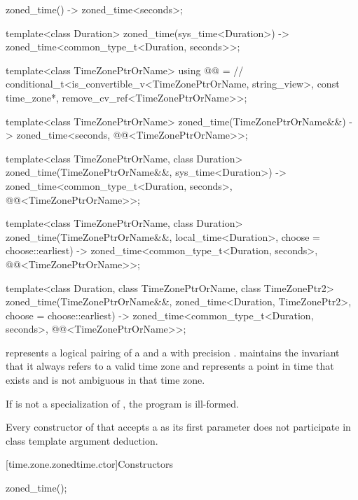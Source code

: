 \begin{codeblock}
{  zoned_time() -> zoned_time<seconds>;

  template<class Duration>
    zoned_time(sys_time<Duration>)
      -> zoned_time<common_type_t<Duration, seconds>>;

  template<class TimeZonePtrOrName>
    using @@ =        // \expos
      conditional_t<is_convertible_v<TimeZonePtrOrName, string_view>,
                    const time_zone*,
                    remove_cv_ref<TimeZonePtrOrName>>;

  template<class TimeZonePtrOrName>
    zoned_time(TimeZonePtrOrName&&)
      -> zoned_time<seconds, @@<TimeZonePtrOrName>>;

  template<class TimeZonePtrOrName, class Duration>
    zoned_time(TimeZonePtrOrName&&, sys_time<Duration>)
      -> zoned_time<common_type_t<Duration, seconds>,
                    @@<TimeZonePtrOrName>>;

  template<class TimeZonePtrOrName, class Duration>
    zoned_time(TimeZonePtrOrName&&, local_time<Duration>,
               choose = choose::earliest)
      -> zoned_time<common_type_t<Duration, seconds>,
                    @@<TimeZonePtrOrName>>;

  template<class Duration, class TimeZonePtrOrName, class TimeZonePtr2>
    zoned_time(TimeZonePtrOrName&&, zoned_time<Duration, TimeZonePtr2>,
               choose = choose::earliest)
      -> zoned_time<common_type_t<Duration, seconds>,
                    @@<TimeZonePtrOrName>>;
}
\end{codeblock}

\pnum
{} represents a logical pairing of
a  and a  with precision .
 maintains the invariant that
it always refers to a valid time zone and
represents a point in time that exists and is not ambiguous
in that time zone.

\pnum
If  is not a specialization of ,
the program is ill-formed.

\pnum
Every constructor of  that
accepts a  as its first parameter
does not participate in
class template argument deduction.

[time.zone.zonedtime.ctor]{Constructors}

%
\begin{itemdecl}
zoned_time();
\end{itemdecl}

